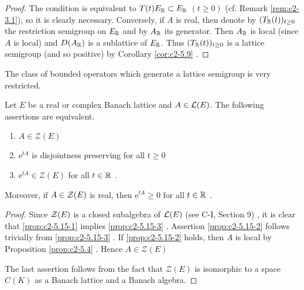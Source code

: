 \begin{proof}
The condition is equivalent to $T(t)E_{\mathbb{R}} \subset E_{\mathbb{R}}$ $(t \geq 0)$ (cf. Remark \ref{rem:c2-3.1}), so it is clearly necessary.
Conversely, if $A$ is real, then denote by $(T_{\mathbb{R}}(t))_{t \geq 0}$ the restriction semigroup on $E_{\mathbb{R}}$ and by $A_{\mathbb{R}}$ its generator.
Then $A_{\mathbb{R}}$ is local (since $A$ is local) and $D(A_{\mathbb{R}})$ is a sublattice of $E_{\mathbb{R}}$.
Thus $(T_{\mathbb{R}}(t))_{t \geq 0}$ is a lattice semigroup (and so positive) by Corollary \ref{cor:c2-5.9}  .
\end{proof}

The class of bounded operators which generate a lattice semigroup is very restricted.

\begin{proposition}\label{prop:c2-5.15}
%
%
%
%
Let $E$ be a real or complex Banach lattice and $A \in \mathcal{L}(E)$. 
The following assertions are equivalent.
\begin{enumerate}[\upshape (a)]
\item \label{prop:c2-5.15-1}
$A \in \mathcal{Z}(E)$
\item \label{prop:c2-5.15-2}
$\mathrm{e}^{tA}$ is disjointness preserving for all $t \geq 0$
\item \label{prop:c2-5.15-3}
$\mathrm{e}^{tA} \in \mathcal{Z}(E)$ for all $t \in \mathbb{R}$ .
\end{enumerate}
Moreover, if $A \in \mathcal{Z}(E)$ is real, then $\mathrm{e}^{tA} \geq 0$ for all $t \in \mathbb{R}$ .
\end{proposition}

\begin{proof}
Since $\mathcal{Z}(E)$ is a closed subalgebra of $\mathcal{L}(E)$ (see C-I, Section 9)
, it is clear that \ref{prop:c2-5.15-1}   implies \ref{prop:c2-5.15-3} .
Assertion \ref{prop:c2-5.15-2}  follows trivially from \ref{prop:c2-5.15-3}  .
If \ref{prop:c2-5.15-2}   holds, then $A$ is local by  Proposition \ref{prop:c2-5.4}  .
Hence $A \in \mathcal{Z}(E)$

The last assertion follows from the fact that $\mathcal{Z}(E)$ is isomorphic to a space $C(K)$ as a Banach lattice and a Banach algebra.
\end{proof}

